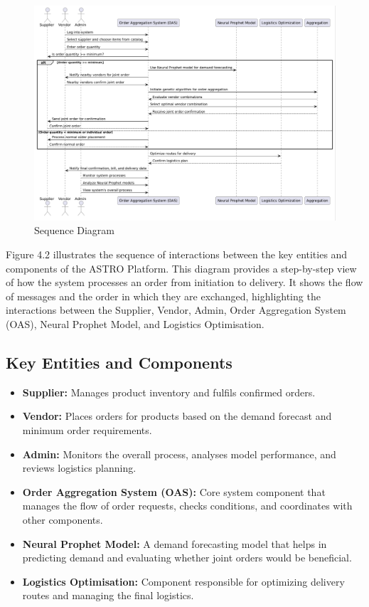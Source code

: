 \begin{figure}[H]
    \centering
    \includegraphics[width=1\textwidth]{Figures/Sequence Diagram.PNG}
    \caption{Sequence Diagram}
    \label{fig:sequence-diagram}
\end{figure}
\noindent Figure 4.2 illustrates the sequence of interactions between the key entities and components of the ASTRO Platform. This diagram provides a step-by-step view of how the system processes an order from initiation to delivery. It shows the flow of messages and the order in which they are exchanged, highlighting the interactions between the Supplier, Vendor, Admin, Order Aggregation System (OAS), Neural Prophet Model, and Logistics Optimisation.
\subsection{Key Entities and Components}
\begin{itemize}
    \item \textbf{Supplier:} Manages product inventory and fulfils confirmed orders.
    \item \textbf{Vendor:} Places orders for products based on the demand forecast and minimum order requirements.
    \item \textbf{Admin:} Monitors the overall process, analyses model performance, and reviews logistics planning.
    \item \textbf{Order Aggregation System (OAS):} Core system component that manages the flow of order requests, checks conditions, and coordinates with other components.
    \item \textbf{Neural Prophet Model:} A demand forecasting model that helps in predicting demand and evaluating whether joint orders would be beneficial.
    \item \textbf{Logistics Optimisation:} Component responsible for optimizing delivery routes and managing the final logistics.
\end{itemize}
